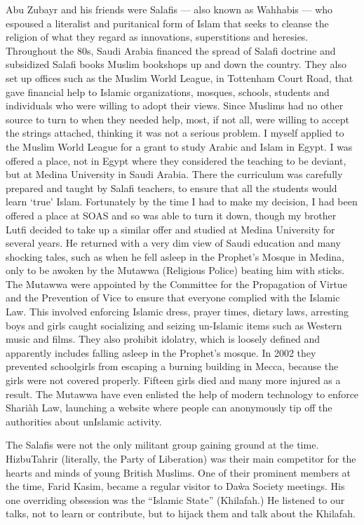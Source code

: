 \documentclass[12pt]{memoir}
\begin{document}
Abu Zubayr and his friends were Salafis — also known as Wahhabis —
who espoused a literalist and puritanical form of Islam
that seeks to cleanse the religion of what they regard
as innovations, superstitions and heresies.
Throughout the 80s, Saudi Arabia financed the spread of Salafi doctrine
and subsidized Salafi books
 Muslim bookshops up and down the country.
They also set up offices such as the Muslim World League,
in Tottenham Court Road, that gave financial help to Islamic organizations,
mosques, schools, students and individuals
who were willing to adopt their views.
Since Muslims had no other source to turn to when they needed help, most,
if not all, were willing to accept the strings attached,
thinking it was not a serious problem.
I myself applied to the Muslim World League
for a grant to study Arabic and Islam in Egypt.
I was offered a place,
not in Egypt where they considered the teaching to be deviant,
but at Medina University in Saudi Arabia.
There the curriculum was carefully prepared and taught by Salafi teachers,
to ensure that all the students would learn ‘true’ Islam.
Fortunately by the time I had to make my decision,
I had been offered a place at SOAS and so was able to turn it down,
though my brother Lutfi decided to take up a similar offer
and studied at Medina University for several years.
He returned with a very dim view of Saudi education and many shocking tales,
such as when he fell asleep in the Prophet’s Mosque in Medina,
only to be awoken by the Mutawwa (Religious Police) beating him with sticks.
The Mutawwa were appointed by the Committee for the Propagation of Virtue
and the Prevention of Vice to ensure
that everyone complied with the Islamic Law.
This involved enforcing Islamic dress, prayer times, dietary laws,
arresting boys and girls caught socializing
and seizing un-Islamic items such as Western music and films.
They also prohibit idolatry,
which is loosely defined and apparently includes falling asleep
in the Prophet’s mosque.
In 2002 they prevented schoolgirls from escaping a burning building in Mecca,
because the girls were not covered properly.
Fifteen girls died and many more injured as a result.
The Mutawwa have even enlisted the help of modern technology
to enforce Shari\`ah Law, launching a website where people can anonymously
tip off the authorities about un\–Islamic activity.

The Salafis were not the only militant group gaining ground at the time.
Hizbu\–Tahrir (literally, the Party of Liberation)
was their main competitor for the hearts and minds of young British Muslims.
One of their prominent members at the time, Farid Kasim,
became a regular visitor to Da\`wa Society meetings.
His one overriding obsession was the “Islamic State” (Khilafah.)
He listened to our talks, not to learn or contribute,
but to hijack them and talk about the Khilafah.
\end{document}
